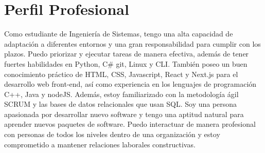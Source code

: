\documentclass{article}
\begin{document}
\vspace{0.2cm}
\section*{Perfil Profesional}
Como estudiante de Ingeniería de Sistemas, tengo una alta capacidad de
adaptación a diferentes entornos y una gran responsabilidad para cumplir con
los plazos. Puedo priorizar y ejecutar tareas de manera efectiva, además de
tener fuertes habilidades en Python, C\# git, Linux y CLI. También poseo un
buen
conocimiento práctico de HTML, CSS, Javascript, React y Next.js para el
desarrollo
web front-end, así como experiencia en los lenguajes de programación C++, Java
y nodeJS. Además, estoy familiarizado con la metodología ágil SCRUM y
las bases de datos relacionales que usan SQL.
Soy una persona apasionada por desarrollar nuevo software y tengo una aptitud
natural para aprender nuevos paquetes de software. Puedo interactuar de manera
profesional con personas de todos los niveles dentro de una organización y
estoy comprometido a mantener relaciones laborales constructivas.
\end{document}
